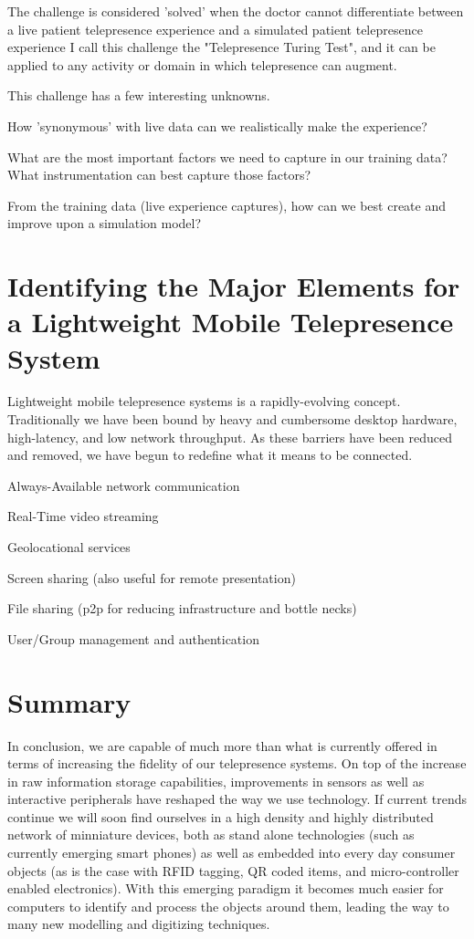 \documentclass[a4paper,12pt]{report}
\begin{document}
The challenge is considered 'solved' when the doctor cannot differentiate between a live patient telepresence experience and a simulated patient telepresence experience
I call this challenge the "Telepresence Turing Test", and it can be applied to any activity or domain in which telepresence can augment.

This challenge has a few interesting unknowns.

How 'synonymous' with live data can we realistically make the experience?

What are the most important factors we need to capture in our training data? What instrumentation can best capture those factors?

From the training data (live experience captures), how can we best create and improve upon a simulation model?\cite{391769} 

\section{Identifying the Major Elements for a Lightweight Mobile Telepresence System}

Lightweight mobile telepresence systems is a rapidly-evolving concept. Traditionally we have been bound by heavy and cumbersome desktop hardware, high-latency, and low network throughput. As these barriers have been reduced and removed, we have begun to redefine what it means to be connected.

Always-Available network communication

Real-Time video streaming

Geolocational services

Screen sharing (also useful for remote presentation)

File sharing (p2p for reducing infrastructure and bottle necks)

User/Group management and authentication

\section{Summary}

In conclusion, we are capable of much more than what is currently offered in terms of increasing the fidelity of our telepresence systems. On top of the increase in raw information storage capabilities, improvements in sensors as well as interactive peripherals have reshaped the way we use technology. If current trends continue we will soon find ourselves in a high density and highly distributed network of minniature devices, both as stand alone technologies (such as currently emerging smart phones) as well as embedded into every day consumer objects (as is the case with RFID tagging, QR coded items, and micro-controller enabled electronics). With this emerging paradigm it becomes much easier for computers to identify and process the objects around them, leading the way to many new modelling and digitizing techniques.
\end{document}
